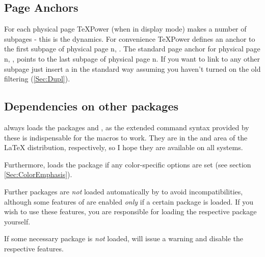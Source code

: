 \documentclass[12pt]{scrartcl}
\let\newslide=\relax
\begin{document}
\newslide

\subsection{Page Anchors}\label{Sec:PageAnch}

For each physical page \TeX Power (when in display mode) makes a number of subpages - this is
the dynamics. For convenience \TeX Power defines an anchor to the first subpage of physical page n,
. The standard page anchor for physical page n,
, points to the last subpage of physical page n. If you want to
link to any other subpage just insert a  in the standard way assuming you haven't
turned on the old filtering (\ref{Sec:Dupl}).

\newslide

\subsection{Dependencies on other packages}
 always loads the packages  and , as the extended command syntax provided by
these is indispensable for the macros to work. They are in the  and  area of the \LaTeX{}
distribution, respectively, so I hope they are available on all systems.

Furthermore,  loads the package  if any color-specific options are set (see section
\ref{Sec:ColorEmphasis}).

Further packages are \emph{not} loaded automatically by  to avoid incompatibilities, although some
features of  are enabled \emph{only} if a certain package is loaded. If you wish to use these features,
you are responsible for loading the respective package yourself.

If some necessary package is \emph{not} loaded,  will issue a warning and disable the respective
features.
\end{document}
